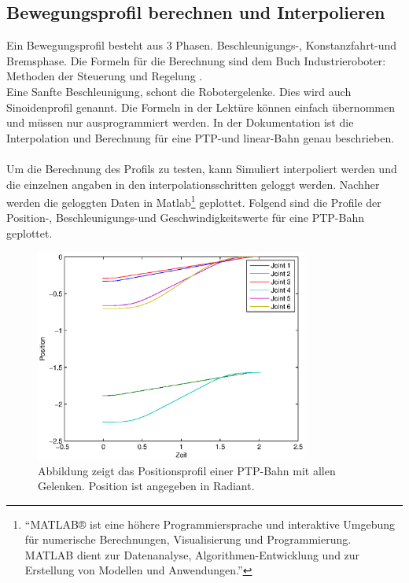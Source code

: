 \subsection{Bewegungsprofil berechnen und Interpolieren}
\label{sub:profile_and_interpolation_rel}

Ein Bewegungsprofil besteht aus 3 Phasen. Beschleunigungs-, Konstanzfahrt-und Bremsphase.
Die Formeln für die Berechnung sind dem Buch Industrieroboter: Methoden der Steuerung und Regelung \cite{WW-2013}.
\\
Eine Sanfte Beschleunigung, schont die Robotergelenke. Dies wird auch Sinoidenprofil genannt. Die Formeln in der Lektüre können einfach übernommen und müssen nur ausprogrammiert werden. In der Dokumentation ist die Interpolation und Berechnung für eine PTP-und linear-Bahn
genau beschrieben.
\\\\
Um die Berechnung des Profils zu testen, kann Simuliert interpoliert werden und die einzelnen angaben in den interpolationsschritten geloggt werden. Nachher werden die geloggten Daten in Matlab\footnote{``MATLAB® ist eine höhere Programmiersprache und interaktive Umgebung für numerische Berechnungen, Visualisierung und Programmierung. MATLAB dient zur Datenanalyse, Algorithmen-Entwicklung und zur Erstellung von Modellen und Anwendungen.''\cite{MATLAB-2014}} geplottet.
Folgend sind die Profile der Position-, Beschleunigungs-und Geschwindigkeitswerte für eine PTP-Bahn geplottet.

\begin{figure}[H]
  \centering
    \includegraphics[width=0.8\textwidth]{pic/position_profile.eps}
      \caption[Positionsprofil einer PTP-Bahn in Matlab gepplotet]{Abbildung zeigt das Positionsprofil einer PTP-Bahn mit allen Gelenken. Position ist angegeben in Radiant.}
      \label{fig:position_ptp_profile}
\end{figure}

